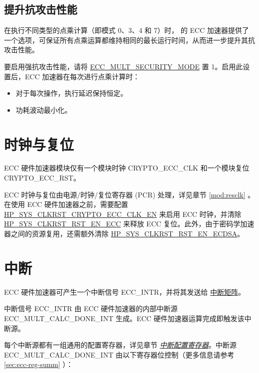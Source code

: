 \documentclass[main\_\_CN.tex]{subfiles}
\begin{document}
\subsection{提升抗攻击性能}
\label{sec:ecc-anti-attack}

在执行不同类型的点乘计算（即模式 0、3、4 和 7）时，\chipname{} 的 ECC 加速器提供了一个选项，可保证所有点乘运算都维持相同的最长运行时间，从而进一步提升其抗攻击性能。

要启用强抗攻击性能，请将 \hyperref[fielddesc:ECCMULTSECURITYMODE]{ECC\_MULT\_SECURITY\_MODE} 置 1。启用此设置后，ECC 加速器在每次进行点乘计算时：

\begin{itemize}
    \item 对于每次操作，执行延迟保持恒定。
    \item 功耗波动最小化。
\end{itemize}


\section{时钟与复位}
\label{sec:ecc-clkrst}

\chipname{} ECC 硬件加速器模块仅有一个模块时钟 CRYPTO\_ECC\_CLK 和一个模块复位 CRYPTO\_ECC\_RST。

ECC 时钟与复位由电源/时钟/复位寄存器 (PCR) 处理，详见章节 \ref{mod:resclk} \textit{}。在使用 ECC 硬件加速器之前，需要配置 \hyperref[fielddesc:HPSYSCLKRSTCRYPTOECCCLKEN]{HP\_SYS\_CLKRST\_CRYPTO\_ECC\_CLK\_EN} 来启用 ECC 时钟，并清除 \hyperref[fielddesc:HPSYSCLKRSTRSTENECC]{HP\_SYS\_CLKRST\_RST\_EN\_ECC} 来释放 ECC 复位。此外，由于密码学加速器之间的资源复用，还需额外清除 \hyperref[fielddesc:HPSYSCLKRSTRSTENECDSA]{HP\_SYS\_CLKRST\_RST\_EN\_ECDSA}。



\section{中断}
\label{sec:ecc-interrupt}

\chipname{} ECC 硬件加速器可产生一个中断信号 ECC\_INTR，并将其发送给 \hyperref[mod:intmtrx]{中断矩阵}。

中断信号 ECC\_INTR 由 ECC 硬件加速器的内部中断源 \label{int:ECCMULTCALCDONEINT}{ECC\_MULT\_CALC\_DONE\_INT} 生成。ECC 硬件加速器运算完成即触发该中断源。

每个中断源都有一组通用的配置寄存器，详见章节 \hyperref[interrupt-config-registers]{\textit{中断配置寄存器}}。中断源 ECC\_MULT\_CALC\_DONE\_INT 由以下寄存器位控制（更多信息请参考 \ref{sec:ecc-reg-summ} \textit{}）：
\end{document}
